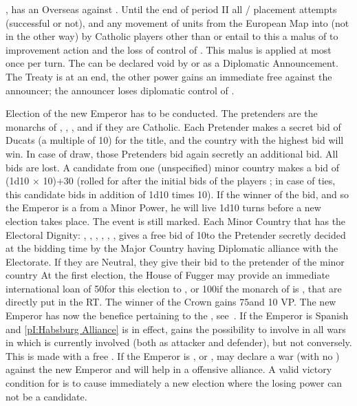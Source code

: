 , \POR has an Overseas \CB against \SPA.
 Until the end of period II all \COL/\TP
placement attempts (successful or not), and any movement of units from the
European Map into \ROTW (not in the other way) by Catholic players other than
\SPA or \POR entail to this \MAJ a malus of  to \STAB improvement
action and the loss of control of \payspapaute. This malus is applied at most
once per turn.
\aparag The  can be declared void by \POR or \SPA
as a Diplomatic Announcement. The Treaty is at an end, the other power gains
an immediate free  against the announcer; the announcer loses
diplomatic control of \payspapaute.





\phevnt
\aparag Election of the new Emperor has to be conducted. The pretenders are
the monarchs of \SPA, \FRA, \ENG, and \POL if they are Catholic.  Each
Pretender makes a secret bid of Ducats (a multiple of 10\ducats) for the
title, and the country with the highest bid will win. In case of draw, those
Pretenders bid again secretly an additional bid. All bids are lost.
\aparag A candidate from one (unspecified) minor country makes a bid of (1d10
$\times$ 10)+30 \ducats (rolled for after the initial bids of the players ; in
case of ties, this candidate bids in addition of 1d10 times 10\ducats). If the
winner of the bid, and so the Emperor is a from a Minor Power, he will live
1d10 turns before a new election takes place. The event is still marked.
\aparag Each Minor Country that has the Electoral Dignity: \paysCologne,
\paysPalatinat, \paysSaxe, \paysTreves, \paysMayence, \paysBrandebourg,
\paysBoheme gives a free bid of 10\ducats to the Pretender secretly decided at
the bidding time by the Major Country having Diplomatic alliance with the
Electorate. If they are Neutral, they give their bid to the pretender of the
minor country
\aparag At the first election, the House of Fugger may provide an immediate
international loan of 50\ducats for this election
to \SPA, or 100\ducats if the monarch of \SPA is , that
are directly put in the RT.
\aparag The winner of the Crown gains 75\ducats and 10 VP.
\aparag The new Emperor has now the benefice pertaining to the \HRE,
see~.
\aparag If the Emperor is Spanish and \ref{pI:Habsburg Alliance} is in effect,
\SPA gains the possibility to involve \HAB in all wars in which \SPA is
currently involved (both as attacker and defender), but not conversely. This
is made with a free \CB.
\aparag If the Emperor is \FRA, \ENG or \POL, \SPA may declare a war (with no
\CB) against the new Emperor and \AUSaus will help in a offensive alliance. A
valid victory condition for \SPA is to cause immediately a new election where
the losing power can not be a candidate.

